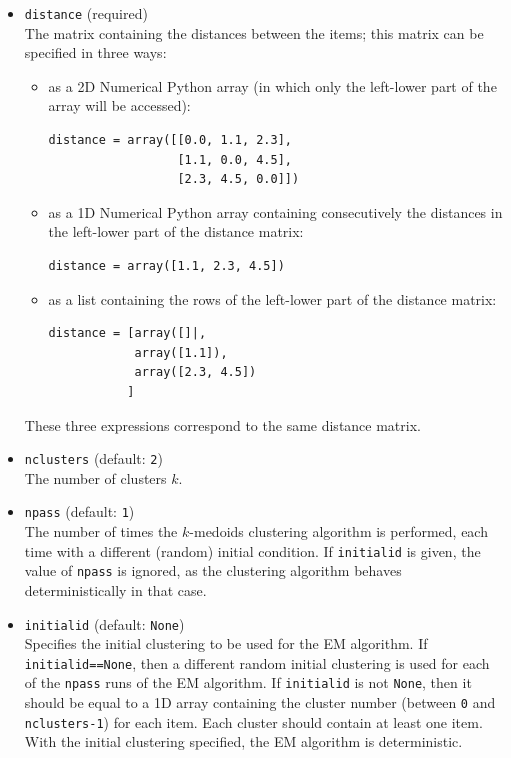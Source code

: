 \documentclass{report}
\begin{document}
\begin{itemize}
\item{\verb|distance|} (required) \\
The matrix containing the distances between the items; this matrix can be specified in three ways:
\begin{itemize}
\item as a 2D Numerical Python array (in which only the left-lower part of the array will be accessed):
\begin{verbatim}
distance = array([[0.0, 1.1, 2.3],
                  [1.1, 0.0, 4.5],
                  [2.3, 4.5, 0.0]])
\end{verbatim}
\item as a 1D Numerical Python array containing consecutively the distances in the left-lower part of the distance matrix:
\begin{verbatim}
distance = array([1.1, 2.3, 4.5])
\end{verbatim}
\item as a list containing the rows of the left-lower part of the distance matrix:
\begin{verbatim}
distance = [array([]|,
            array([1.1]),
            array([2.3, 4.5])
           ]
\end{verbatim}
\end{itemize}
These three expressions correspond to the same distance matrix.
\item \verb|nclusters| (default: \verb|2|) \\
The number of clusters $k$.
\item \verb|npass| (default: \verb|1|) \\
The number of times the $k$-medoids clustering algorithm is performed, each time with a different (random) initial condition. If \verb|initialid| is given, the value of \verb|npass| is ignored, as the clustering algorithm behaves deterministically in that case.
\item \verb|initialid| (default: \verb|None|) \\
Specifies the initial clustering to be used for the EM algorithm. If \verb|initialid==None|, then a different random initial clustering is used for each of the \verb|npass| runs of the EM algorithm. If \verb|initialid| is not \verb|None|, then it should be equal to a 1D array containing the cluster number (between \verb|0| and \verb|nclusters-1|) for each item. Each cluster should contain at least one item. With the initial clustering specified, the EM algorithm is deterministic.
\end{itemize}
\end{document}
